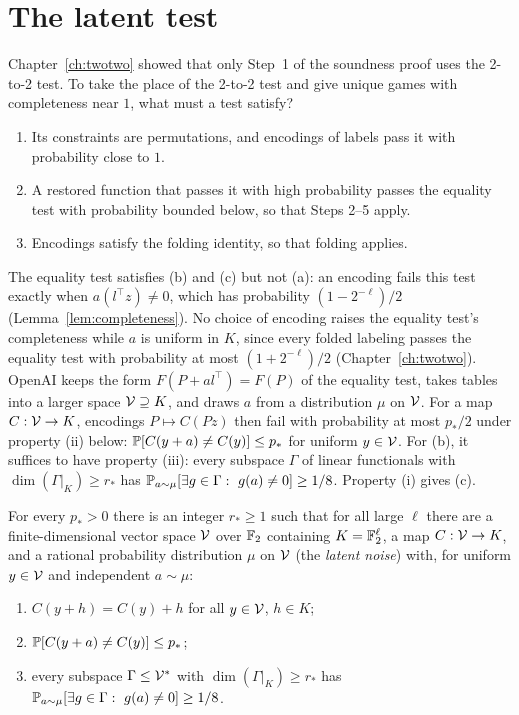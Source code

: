 \chapter{The latent test}\label{ch:openai}

Chapter~\ref{ch:twotwo} showed that only Step~1 of the soundness proof uses the 2-to-2 test. To take the place of the 2-to-2 test and give unique games with completeness near $1$, what must a test satisfy?
\begin{enumerate}[label=(\alph*)]
\item Its constraints are permutations, and encodings of labels pass it with probability close to $1$.
\item A restored function that passes it with high probability passes the equality test with probability bounded below, so that Steps 2--5 apply.
\item Encodings satisfy the folding identity, so that folding applies.
\end{enumerate}
The equality test satisfies (b) and (c) but not (a): an encoding fails this test exactly when $a(l^\top z)\ne0$, which has probability $(1-2^{-\ell})/2$ (Lemma~\ref{lem:completeness}). No choice of encoding raises the equality test's completeness while $a$ is uniform in $K$, since every folded labeling passes the equality test with probability at most $(1+2^{-\ell})/2$ (Chapter~\ref{ch:twotwo}). OpenAI keeps the form $F(P+al^\top)=F(P)$ of the equality test, takes tables into a larger space $\mathcal{V}\supseteq K$, and draws $a$ from a distribution $\mu$ on $\mathcal{V}$. For a map $C:\mathcal{V}\to K$, encodings $P\mapsto C(Pz)$ then fail with probability at most $p_*/2$ under property (ii) below: $\mathbb{P}[C(y+a)\ne C(y)]\le p_*$ for uniform $y\in\mathcal{V}$. For (b), it suffices to have property (iii): every subspace $\Gamma$ of linear functionals with $\dim(\Gamma|_K)\ge r_*$ has $\Prob_{a\sim\mu}[\exists g\in\Gamma:\ g(a)\ne0]\ge1/8$. Property (i) gives (c).

\begin{lemma}\label{lem:latent}
For every $p_*>0$ there is an integer $r_*\ge1$ such that for all large $\ell$ there are a finite-dimensional vector space $\mathcal{V}$ over $\mathbb{F}_2$ containing $K=\mathbb{F}_2^\ell$, a map $C:\mathcal{V}\to K$, and a rational probability distribution $\mu$ on $\mathcal{V}$ (the \emph{latent noise}) with, for uniform $y\in\mathcal{V}$ and independent $a\sim\mu$:
\begin{enumerate}[label=(\roman*)]
\item $C(y+h)=C(y)+h$ for all $y\in\mathcal{V}$, $h\in K$;
\item $\mathbb{P}[C(y+a)\ne C(y)]\le p_*$;
\item every subspace $\Gamma\le\mathcal{V}^*$ with $\dim(\Gamma|_K)\ge r_*$ has $\Prob_{a\sim\mu}[\exists g\in\Gamma:\ g(a)\ne0]\ge1/8$.
\end{enumerate}
\end{lemma}

